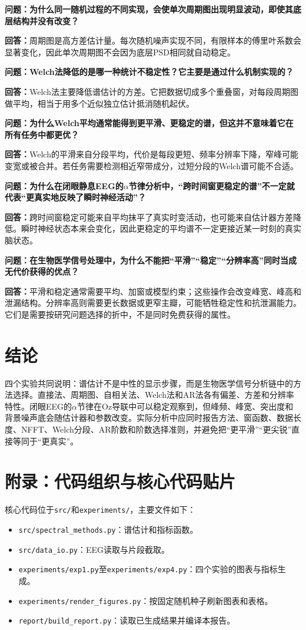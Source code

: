 \documentclass[UTF8,zihao=-4,fontset=windows]{ctexart}
\begin{document}
\textbf{问题：为什么同一随机过程的不同实现，会使单次周期图出现明显波动，即使其底层结构并没有改变？}

\textbf{回答：}周期图是高方差估计量。每次随机噪声实现不同，有限样本的傅里叶系数会显著变化，因此单次周期图不会因为底层PSD相同就自动稳定。

\textbf{问题：Welch法降低的是哪一种统计不稳定性？它主要是通过什么机制实现的？}

\textbf{回答：}Welch法主要降低谱估计的方差。它把数据切成多个重叠窗，对每段周期图做平均，相当于用多个近似独立估计抵消随机起伏。

\textbf{问题：为什么Welch平均通常能得到更平滑、更稳定的谱，但这并不意味着它在所有任务中都更优？}

\textbf{回答：}Welch的平滑来自分段平均，代价是每段更短、频率分辨率下降，窄峰可能变宽或被合并。若任务需要检测相近窄带成分，过短分段的Welch谱可能不合适。

\textbf{问题：为什么在闭眼静息EEG的$\alpha$节律分析中，“跨时间窗更稳定的谱”不一定就代表“更真实地反映了瞬时神经活动”？}

\textbf{回答：}跨时间窗稳定可能来自平均抹平了真实时变活动，也可能来自估计器方差降低。瞬时神经状态本来会变化，因此更稳定的平均谱不一定更接近某一时刻的真实脑状态。

\textbf{问题：在生物医学信号处理中，为什么不能把“平滑”“稳定”“分辨率高”同时当成无代价获得的优点？}

\textbf{回答：}平滑和稳定通常需要平均、加窗或模型约束；这些操作会改变峰宽、峰高和泄漏结构。分辨率高则需要更长数据或更窄主瓣，可能牺牲稳定性和抗泄漏能力。它们是需要按研究问题选择的折中，不是同时免费获得的属性。

\FloatBarrier
\section{结论}
四个实验共同说明：谱估计不是中性的显示步骤，而是生物医学信号分析链中的方法选择。直接法、周期图、自相关法、Welch法和AR法各有偏差、方差和分辨率特性。闭眼EEG的$\alpha$节律在Oz导联中可以稳定观察到，但峰频、峰宽、突出度和背景噪声底会随估计器和参数改变。实际分析中应同时报告方法、窗函数、数据长度、NFFT、Welch分段、AR阶数和阶数选择准则，并避免把“更平滑”“更尖锐”直接等同于“更真实”。

\section{附录：代码组织与核心代码贴片}
核心代码位于\texttt{src/}和\texttt{experiments/}，主要文件如下：
\begin{itemize}
  \item \texttt{src/spectral\_methods.py}：谱估计和指标函数。
  \item \texttt{src/data\_io.py}：EEG读取与片段截取。
  \item \texttt{experiments/exp1.py}至\texttt{experiments/exp4.py}：四个实验的图表与指标生成。
  \item \texttt{experiments/render\_figures.py}：按固定随机种子刷新图表和表格。
  \item \texttt{report/build\_report.py}：读取已生成结果并编译本报告。
\end{itemize}
\end{document}
